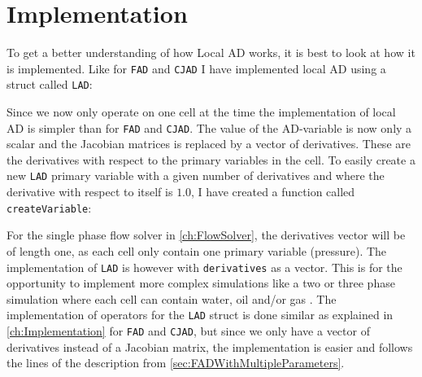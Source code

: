 \section{Implementation}
\label{sec:LADImplementation}
To get a better understanding of how Local AD works, it is best to look at how it is implemented. Like for \texttt{FAD} and \texttt{CJAD} I have implemented local AD using a struct called \texttt{LAD}:

Since we now only operate on one cell at the time the implementation of local AD is simpler than for \texttt{FAD} and \texttt{CJAD}. The value of the AD-variable is now only a scalar and the Jacobian matrices is replaced by a vector of derivatives. These are the derivatives  with respect to the primary variables in the cell. To easily create a new \texttt{LAD} primary variable with a given number of derivatives and where the derivative with respect to itself is $1.0$, I have created a function called \texttt{createVariable}:

For the single phase flow solver in \autoref{ch:FlowSolver}, the derivatives vector will be of length one, as each cell only contain one primary variable (pressure). The implementation of \texttt{LAD} is however with \texttt{derivatives} as a vector. This is for the opportunity to implement more complex simulations like a two or three phase simulation where each cell can contain water, oil and/or gas . The implementation of operators for the \texttt{LAD} struct is done similar as explained in \autoref{ch:Implementation} for \texttt{FAD} and \texttt{CJAD}, but since we only have a vector of derivatives instead of a Jacobian matrix, the implementation is easier and follows the lines of the description from \autoref{sec:FADWithMultipleParameters}. 

